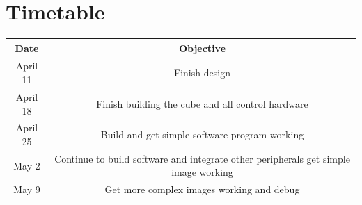 \documentclass[11pt]{article} %
\begin{document}
\section{Timetable}
\begin{center}
	\begin{tabular}{ | c | c | }
	\hline
	Date & Objective \\ \hline
	April 11 & Finish design \\ \hline
	April 18 & Finish building the cube and all control hardware \\ \hline
	April 25 & Build and get simple software program working \\ \hline
	May 2  & Continue to build software and integrate other peripherals get simple image working\\ \hline
	May 9 & Get more complex images working and debug \\ \hline
	\end{tabular}
\end{center}
\end{document}
